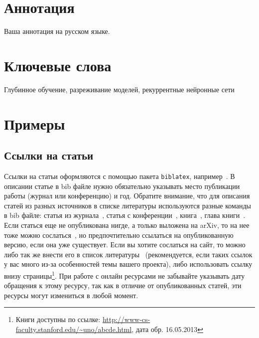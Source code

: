 \documentclass[a4paper,12pt]{extarticle}
\begin{document}
\newpage
\setcounter{page}{2}

{
    \hypersetup{linkcolor=black}
    \tableofcontents
}

\newpage

\newpage
\section*{Аннотация}   %
Ваша аннотация на русском языке.


\section*{Ключевые слова}
Глубинное обучение, разреживание моделей, рекуррентные нейронные сети
\pagebreak

\section{Примеры}
\subsection{Ссылки на статьи}

Ссылки на статьи оформляются с помощью пакета \texttt{biblatex}, например~\cite{chirkova18}. В описании статье в bib файле нужно обязательно указывать место публикации работы (журнал или конференцию) и год. Обратите внимание, что для описания статей из разных источников в списке литературы используются разные команды в bib файле: статья из журнала~\cite{ctan}, статья с конференции~\cite{chirkova18}, книга~\cite{knuth-acp}, глава книги~\cite{knuth-fa}. Если статься еще не опубликована нигде, а только выложена на arXiv, то на нее тоже можно сослаться~\cite{chirkova18_arxiv}, но предпочтительно ссылаться на опубликованную версию, если она уже существует. Если вы хотите сослаться на сайт, то можно либо так же внести его в список литературы~\cite{knuthwebsite} (рекомендуется, если таких ссылок у вас много из-за особенностей темы вашего проекта), либо использовать ссылку внизу страницы\footnote{Книги доступны по ссылке: \url{http://www-cs-faculty.stanford.edu/~uno/abcde.html}, дата обр. 16.05.2013}. При работе с онлайн ресурсами не забывайте указывать дату обращения к этому ресурсу, так как в отличие от опубликованных статей, эти ресурсы могут измениться в любой момент.
\end{document}
